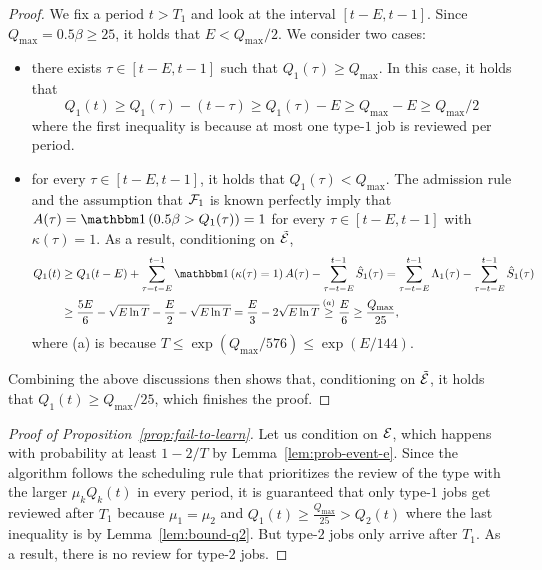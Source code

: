 \begin{proof}
We fix a period $t > T_1$ and look at the interval $[t - E,t - 1]$. Since $Q_{\max} = 0.5\beta \geq 25$, it holds that $E < Q_{\max} / 2$. We consider two cases:
\begin{itemize}
\item there exists $\tau \in [t-E,t-1]$ such that $Q_1(\tau) \geq Q_{\max}$. In this case, it holds that \[Q_1(t) \geq Q_1(\tau) - (t-\tau) \geq Q_1(\tau) - E \geq Q_{\max} - E \geq Q_{\max} / 2\]
where the first inequality is because at most one type-$1$ job is reviewed per period.
\item for every $\tau \in [t-E,t-1]$, it holds that $Q_1(\tau) < Q_{\max}$. The admission rule and the assumption that $\mathcal{F}_1$ is known perfectly imply that $A(\tau) = \indic{0.5\beta > Q_1(\tau)} = 1$ for every $\tau \in [t-E,t-1]$ with $\kappa(\tau) = 1$. As a result, conditioning on $\tilde{\mathcal{E}}$,
\begin{align*}
Q_1(t) &\geq Q_1(t-E)+\sum_{\tau=t-E}^{t-1} \indic{\kappa(\tau)=1}A(\tau) - \sum_{\tau=t-E}^{t-1} \hat{S}_1(\tau) = \sum_{\tau=t-E}^{t-1} \Lambda_1(\tau) - \sum_{\tau=t-E}^{t-1} \hat{S}_1(\tau) \\
&\geq \frac{5E}{6} - \sqrt{E\ln T} - \frac{E}{2} - \sqrt{E\ln T} = \frac{E}{3}-2\sqrt{E\ln T} \overset{(a)}{\geq} \frac{E}{6} \geq \frac{Q_{\max}}{25},
\end{align*}
where (a) is because $T \leq \exp(Q_{\max} / 576) \leq \exp(E / 144)$.
\end{itemize}
Combining the above discussions then shows that, conditioning on $\tilde{\mathcal{E}}$, it holds that $Q_1(t) \geq Q_{\max} / 25$, which finishes the proof.
\end{proof}

\begin{proof}[Proof of Proposition~\ref{prop:fail-to-learn}]
Let us condition on $\mathcal{E}$, which happens with probability at least $1 - 2/T$ by Lemma~\ref{lem:prob-event-e}. Since the algorithm follows the scheduling rule that prioritizes the review of the type with the larger $\mu_k Q_k(t)$ in every period, it is guaranteed that only type-$1$ jobs get reviewed after $T_1$ because $\mu_1 = \mu_2$ and $Q_1(t) \geq \frac{Q_{\max}}{25} > Q_2(t)$ where the last inequality is by Lemma~\ref{lem:bound-q2}. But type-$2$ jobs only arrive after $T_1$. As a result, there is no review for type-$2$ jobs.
\end{proof}

